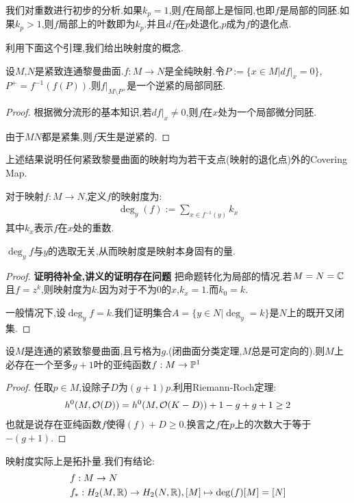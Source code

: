 我们对重数进行初步的分析.如果$k_p=1$,则$f$在局部上是恒同,也即$f$是局部的同胚.如果$k_p>1$,则$f$局部上的叶数即为$k_p$.并且$df$在$p$处退化,$p$成为$f$的退化点.

利用下面这个引理,我们给出映射度的概念.
\begin{lemma}
	设$M$,$N$是紧致连通黎曼曲面.$f:M \to N$是全纯映射.令$P:=\{x \in M|df|_x=0\}$,$P^+=f^{-1}(f(P))$.则$f|_{M\setminus P^+}$是一个逆紧的局部同胚.
\end{lemma}
\begin{proof}
	根据微分流形的基本知识,若$df|_x \neq 0$,则$f$在$x$处为一个局部微分同胚.

	由于$M$$N$都是紧集,则$f$天生是逆紧的.
\end{proof}
上述结果说明任何紧致黎曼曲面的映射均为若干支点(映射的退化点)外的Covering Map.

\begin{definition}
	对于映射$f:M \to N$,定义$f$的映射度为:
	\begin{align*}
		\deg_y(f):=\sum_{x \in f^{-1}(y)}k_x
	\end{align*}
	其中$k_x$表示$f$在$x$处的重数.
\end{definition}
\begin{proposition}
	$\deg_y f$与$y$的选取无关,从而映射度是映射本身固有的量.
\end{proposition}
\begin{proof}\textbf{证明待补全,讲义的证明存在问题}
	把命题转化为局部的情况.若$M=N=\mathbb{C}$且$f=z^k$,则映射度为$k$.因为对于不为$0$的$x$,$k_x=1$.而$k_0=k$.

	一般情况下,设$\deg_y f=k$.我们证明集合$A=\{y \in N|\deg_y =k\}$是$N$上的既开又闭集.

\end{proof}
\begin{theorem}
	设$M$是连通的紧致黎曼曲面,且亏格为$g$.(闭曲面分类定理,$M$总是可定向的).则$M$上必存在一个至多$g+1$叶的亚纯函数$f: M \to \mathbb{P}^1$
\end{theorem}
\begin{proof}
	任取$p \in M$,设除子$D$为$(g+1)p$.利用Riemann-Roch定理:
	\begin{align*}
		h^0(M,\mathcal{O}(D))=h^0(M,\mathcal{O}(K-D))+1-g+g+1\geq 2
	\end{align*}
	也就是说存在亚纯函数$f$使得$(f)+D\geq 0$.换言之$f$在$p$上的次数大于等于$-(g+1)$.
\end{proof}
\begin{remark}
	映射度实际上是拓扑量.我们有结论:
	\begin{align*}
		&f:M \to N\\
		&f_*:H_2(M,\mathbb{R}) \to H_2(N,\mathbb{R}),[M] \mapsto \mathrm{deg}(f)[M]=[N]
	\end{align*}
\end{remark}
